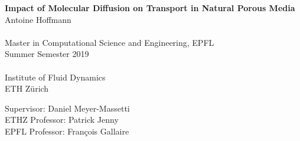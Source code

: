 \documentclass[smallheadings,headsepline,11pt,oneside,a4paper]{scrbook}
\begin{document}
\frontmatter							%


\begin{titlepage}
\begin{center}
    \vspace*{1cm}
    {\huge \bfseries  Impact of Molecular Diffusion on Transport in Natural Porous Media\\ }
    \vspace{2cm}
    {\large 
	Antoine Hoffmann\\
	~\\
	Master in Computational Science and Engineering, EPFL\\
	\vspace{3.5cm}
	Summer Semester 2019\\
	~\\
	Institute of Fluid Dynamics\\
	ETH Zürich\\
    }




{\large
	Supervisor: Daniel Meyer-Massetti\\[\baselineskip]
	ETHZ Professor: Patrick Jenny\\[\baselineskip]
	EPFL Professor: François Gallaire
}
\end{center}

\vspace*{2cm} %

\end{titlepage}



\begin{titlepage}
\thispagestyle{empty}
\newpage
\mbox{}
\end{titlepage}






\tableofcontents
\end{document}
